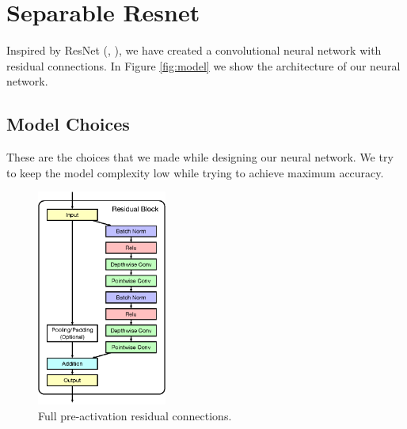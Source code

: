 \section{Separable Resnet}
Inspired by ResNet (\cite{He:2015aa}, \cite{he2016identity}), we have created a convolutional neural network with residual connections. In Figure \ref{fig:model} we show the architecture of our neural network.


\subsection{Model Choices}
These are the choices that we made while designing our neural network. We try to keep the model complexity low while trying to achieve maximum accuracy.
\begin{figure}
\vspace{-65px}
\begin{center}
\includegraphics[width=0.38\textwidth]{images/full_preactivation.eps}
\end{center}
\caption{Full pre-activation residual connections.}
\label{fig:full-preactivation}
\end{figure}

